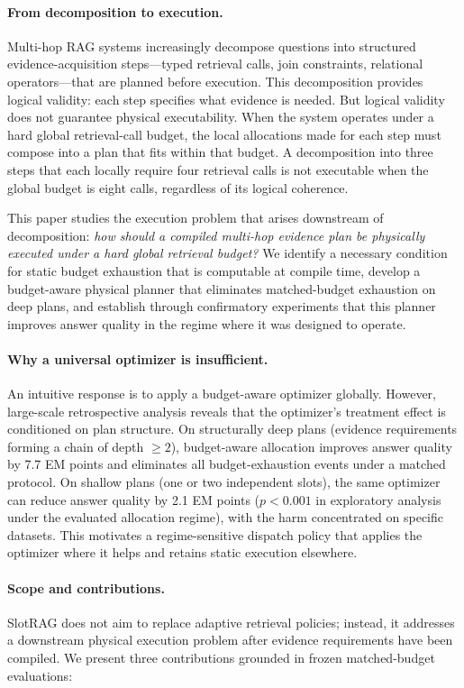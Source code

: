 \paragraph{From decomposition to execution.}
Multi-hop RAG systems increasingly decompose questions into structured evidence-acquisition steps---typed retrieval calls, join constraints, relational operators---that are planned before execution. This decomposition provides logical validity: each step specifies what evidence is needed. But logical validity does not guarantee physical executability. When the system operates under a hard global retrieval-call budget, the local allocations made for each step must compose into a plan that fits within that budget. A decomposition into three steps that each locally require four retrieval calls is not executable when the global budget is eight calls, regardless of its logical coherence.

This paper studies the execution problem that arises downstream of decomposition: \emph{how should a compiled multi-hop evidence plan be physically executed under a hard global retrieval budget?} We identify a necessary condition for static budget exhaustion that is computable at compile time, develop a budget-aware physical planner that eliminates matched-budget exhaustion on deep plans, and establish through confirmatory experiments that this planner improves answer quality in the regime where it was designed to operate.

\paragraph{Why a universal optimizer is insufficient.}
An intuitive response is to apply a budget-aware optimizer globally. However, large-scale retrospective analysis reveals that the optimizer's treatment effect is conditioned on plan structure. On structurally deep plans (evidence requirements forming a chain of depth $\geq 2$), budget-aware allocation improves answer quality by 7.7 EM points and eliminates all budget-exhaustion events under a matched protocol. On shallow plans (one or two independent slots), the same optimizer can reduce answer quality by 2.1 EM points ($p < 0.001$ in exploratory analysis under the evaluated allocation regime), with the harm concentrated on specific datasets. This motivates a regime-sensitive dispatch policy that applies the optimizer where it helps and retains static execution elsewhere.

\paragraph{Scope and contributions.}
SlotRAG does not aim to replace adaptive retrieval policies; instead, it addresses a downstream physical execution problem after evidence requirements have been compiled. We present three contributions grounded in frozen matched-budget evaluations:

